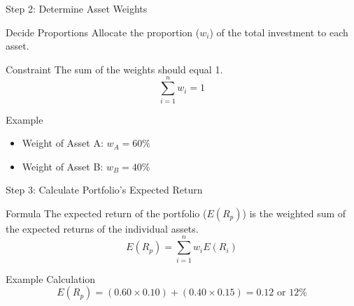 \documentclass{beamer}
\begin{document}
\begin{frame}{Step 2: Determine Asset Weights}
    \begin{block}{Decide Proportions}
        Allocate the proportion (\(w_i\)) of the total investment to each asset.
    \end{block}
    \begin{block}{Constraint}
        The sum of the weights should equal 1.
        \begin{equation*}
            \sum_{i=1}^{n} w_i = 1
        \end{equation*}
    \end{block}
    \begin{block}{Example}
        \begin{itemize}
            \item Weight of Asset A: \(w_A = 60\%\)
            \item Weight of Asset B: \(w_B = 40\%\)
        \end{itemize}
    \end{block}
\end{frame}


\begin{frame}{Step 3: Calculate Portfolio's Expected Return}
    \begin{block}{Formula}
        The expected return of the portfolio (\(E(R_p)\)) is the weighted sum of the expected returns of the individual assets.
        \begin{equation*}
            E(R_p) = \sum_{i=1}^{n} w_i E(R_i)
        \end{equation*}
    \end{block}
    \begin{block}{Example Calculation}
        \begin{equation*}
            E(R_p) = (0.60 \times 0.10) + (0.40 \times 0.15) = 0.12 \text{ or 12\%}
        \end{equation*}
    \end{block}
\end{frame}
\end{document}
